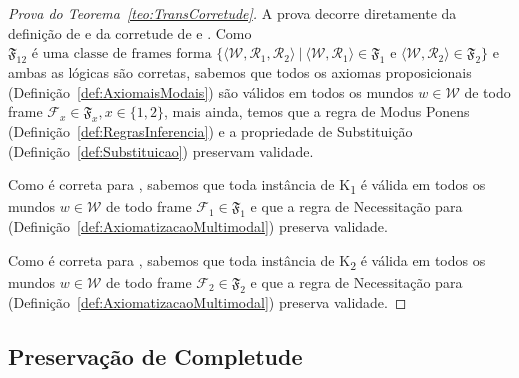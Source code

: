             \begin{proof}[Prova do Teorema~\ref{teo:TransCorretude}]
                A prova decorre diretamente da definição de  e da corretude de  e .
                Como \(\mathfrak{F}_{12} \text{ é uma classe de frames forma } \{ \langle \mathcal{W}, \mathcal{R}_1, \mathcal{R}_2 \rangle \ | \ \langle \mathcal{W}, \mathcal{R}_1 \rangle
                \in \mathfrak{F}_1 \text{ e } \langle \mathcal{W}, \mathcal{R}_2 \rangle \in \mathfrak{F}_2\}\) e ambas as lógicas são corretas, sabemos que todos
                os axiomas proposicionais (Definição~\ref{def:AxiomaisModais}) são válidos em todos os mundos \(w \in \mathcal{W}\) de todo frame
                \(\mathcal{F}_{x} \in \mathfrak{F}_{x}, x \in \{1,2\}\), mais ainda, temos que a regra de Modus Ponens (Definição~\ref{def:RegrasInferencia}) e a
                propriedade de Substituição (Definição~\ref{def:Substituicao}) preservam validade.

                Como  é correta para , sabemos que toda instância de K\textsubscript{1} é válida em todos os mundos \(w \in \mathcal{W}\)
                de todo frame \(\mathcal{F}_{1} \in \mathfrak{F}_{1}\) e que a regra de Necessitação para  (Definição~\ref{def:AxiomatizacaoMultimodal}) preserva validade.

                Como  é correta para , sabemos que toda instância de K\textsubscript{2} é válida em todos os mundos \(w \in \mathcal{W}\)
                de todo frame \(\mathcal{F}_{2} \in \mathfrak{F}_{2}\) e que a regra de Necessitação para  (Definição~\ref{def:AxiomatizacaoMultimodal}) preserva validade.
            \end{proof}

        \subsection{Preservação de Completude}
            \label{subsec:PreservacaoCompletude}

